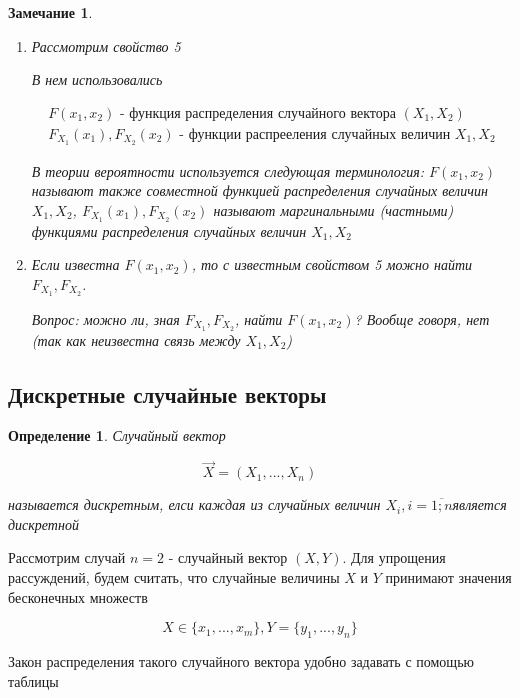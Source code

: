 \documentclass[a4paper, 14pt]{report}
\newtheorem{defenition}{Определение}[section]
\newtheorem{note}{Замечание}[section]
\begin{document}
\begin{note}
    \begin{enumerate}
        \item Рассмотрим свойство 5

            В нем использовались

            $$
            \begin{matrix}
                F(x_1, x_2) \text{ - функция распределения случайного вектора } (X_1, X_2) \\
                F_{X_1}(x_1), F_{X_2} (x_2) \text{ - функции распрееления случайных величин } X_1, X_2
            \end{matrix}
            $$

            В теории вероятности используется следующая терминология:
            $F(x_1, x_2)$ называют также совместной функцией распределения случайных величин $X_1, X_2$, $F_{X_1}(x_1), F_{X_2}(x_2)$ называют маргинальными (частными) функциями распределения случайных величин $X_1, X_2$

        \item Если известна $F(x_1, x_2)$, то с известным свойством 5 можно найти $F_{X_1}, F_{X_2}$.

            Вопрос: можно ли, зная $F_{X_1}, F_{X_2}$, найти $F(x_1, x_2)$?
            Вообще говоря, нет (так как неизвестна связь между $X_1, X_2$)
    \end{enumerate}
\end{note}

\subsection{Дискретные случайные векторы}

\begin{defenition}
    Случайный вектор

    $$
    \vec X = (X_1, ..., X_n)
    $$

    называется дискретным, елси каждая из случайных величин $X_i, i = \overline{1;n}$является дискретной
\end{defenition}

Рассмотрим случай $n=2$ - случайный вектор $(X,Y)$. Для упрощения рассуждений, будем считать, что случайные величины $X$ и $Y$ принимают значения бесконечных множеств

$$
X \in \{ x_1, ..., x_m\}, Y = \{y_1,...,y_n\}
$$

Закон распределения такого случайного вектора удобно задавать с помощью таблицы
\end{document}
